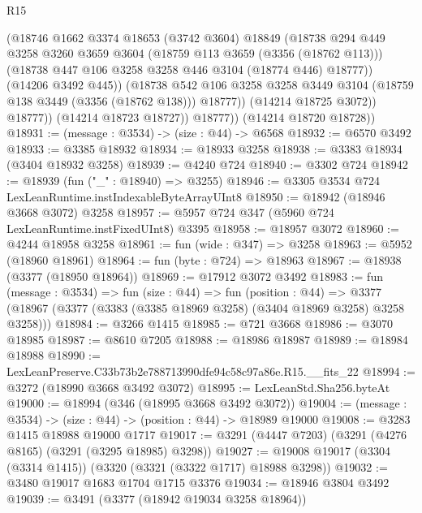 \begin{lexlean}{R15}
\begin{coremodule}
                    (@18746
                      @1662
                      @3374
                      @18653
                      (@3742 @3604)
                      @18849
                      (@18738
                        @294
                        @449
                        @3258
                        @3260
                        @3659
                        @3604
                        (@18759 @113 @3659 (@3356 (@18762 @113)))
                        (@18738 @447 @106 @3258 @3258 @446 @3104 (@18774 @446) @18777))
                      (@14206 @3492 @445))
                    (@18738
                      @542
                      @106
                      @3258
                      @3258
                      @3449
                      @3104
                      (@18759 @138 @3449 (@3356 (@18762 @138)))
                      @18777))
                  (@14214 @18725 @3072))
                @18777))
            (@14214 @18723 @18727))
          @18777))
      (@14214 @18720 @18728))
@18931 := (message : @3534) -> (size : @44) -> @6568
@18932 := @6570 @3492
@18933 := @3385 @18932
@18934 := @18933 @3258
@18938 := @3383 @18934 (@3404 @18932 @3258)
@18939 := @4240 @724
@18940 := @3302 @724
@18942 := @18939 (fun ("_" : @18940) => @3255)
@18946 := @3305 @3534 @724 LexLeanRuntime.instIndexableByteArrayUInt8
@18950 := @18942 (@18946 @3668 @3072) @3258
@18957 := @5957 @724 @347 (@5960 @724 LexLeanRuntime.instFixedUInt8) @3395
@18958 := @18957 @3072
@18960 := @4244 @18958 @3258
@18961 := fun (wide : @347) => @3258
@18963 := @5952 (@18960 @18961)
@18964 := fun (byte : @724) => @18963
@18967 := @18938 (@3377 (@18950 @18964))
@18969 := @17912 @3072 @3492
@18983 := fun (message : @3534) =>
  fun (size : @44) =>
  fun (position : @44) =>
  @3377 (@18967 (@3377 (@3383 (@3385 @18969 @3258) (@3404 @18969 @3258) @3258 @3258)))
@18984 := @3266 @1415
@18985 := @721 @3668
@18986 := @3070 @18985
@18987 := @8610 @7205
@18988 := @18986 @18987
@18989 := @18984 @18988
@18990 := LexLeanPreserve.C33b73b2e788713990dfe94c58c97a86e.R15.__fits_22
@18994 := @3272 (@18990 @3668 @3492 @3072)
@18995 := LexLeanStd.Sha256.byteAt
@19000 := @18994 (@346 (@18995 @3668 @3492 @3072))
@19004 := (message : @3534) -> (size : @44) -> (position : @44) -> @18989 @19000
@19008 := @3283 @1415 @18988 @19000 @1717
@19017 := @3291 (@4447 @7203) (@3291 (@4276 @8165) (@3291 (@3295 @18985) @3298))
@19027 := @19008 @19017 (@3304 (@3314 @1415)) (@3320 (@3321 (@3322 @1717) @18988 @3298))
@19032 := @3480 @19017 @1683 @1704 @1715 @3376
@19034 := @18946 @3804 @3492
@19039 := @3491 (@3377 (@18942 @19034 @3258 @18964))

\end{coremodule}
\end{lexlean}
